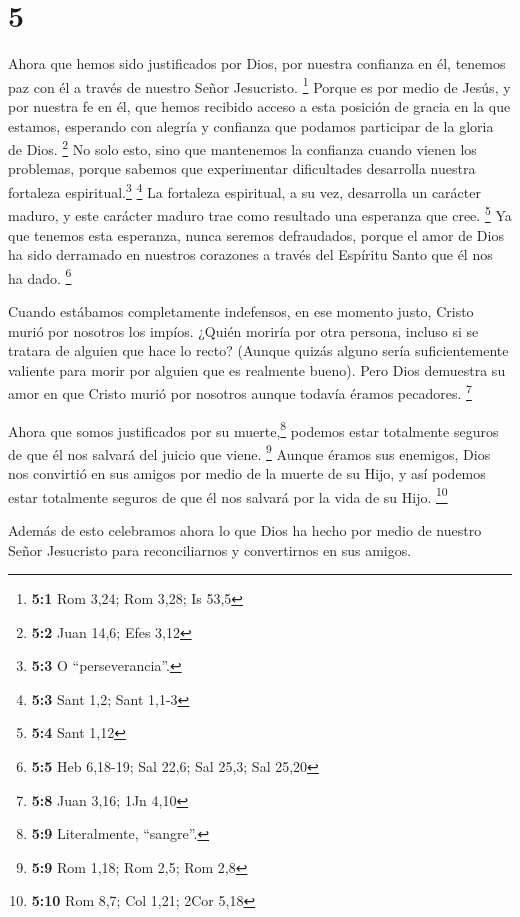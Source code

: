 \hypertarget{section-4}{%
\section{5}\label{section-4}}

 Ahora que hemos sido justificados por Dios, por nuestra
confianza en él, tenemos paz con él a través de nuestro Señor
Jesucristo. \footnote{\textbf{5:1} Rom 3,24; Rom 3,28; Is 53,5}
 Porque es por medio de Jesús, y por nuestra fe en él, que
hemos recibido acceso a esta posición de gracia en la que estamos,
esperando con alegría y confianza que podamos participar de la gloria de
Dios. \footnote{\textbf{5:2} Juan 14,6; Efes 3,12}  No
solo esto, sino que mantenemos la confianza cuando vienen los problemas,
porque sabemos que experimentar dificultades desarrolla nuestra
fortaleza espiritual.\footnote{\textbf{5:3} O ``perseverancia''.}
\footnote{\textbf{5:3} Sant 1,2; Sant 1,1-3}  La fortaleza
espiritual, a su vez, desarrolla un carácter maduro, y este carácter
maduro trae como resultado una esperanza que cree. \footnote{\textbf{5:4}
  Sant 1,12}  Ya que tenemos esta esperanza, nunca seremos
defraudados, porque el amor de Dios ha sido derramado en nuestros
corazones a través del Espíritu Santo que él nos ha dado. \footnote{\textbf{5:5}
  Heb 6,18-19; Sal 22,6; Sal 25,3; Sal 25,20}

 Cuando estábamos completamente indefensos, en ese momento
justo, Cristo murió por nosotros los impíos.  ¿Quién
moriría por otra persona, incluso si se tratara de alguien que hace lo
recto? (Aunque quizás alguno sería suficientemente valiente para morir
por alguien que es realmente bueno).  Pero Dios demuestra
su amor en que Cristo murió por nosotros aunque todavía éramos
pecadores. \footnote{\textbf{5:8} Juan 3,16; 1Jn 4,10}

 Ahora que somos justificados por su muerte,\footnote{\textbf{5:9}
  Literalmente, ``sangre''.} podemos estar totalmente seguros de que él
nos salvará del juicio que viene. \footnote{\textbf{5:9} Rom 1,18; Rom
  2,5; Rom 2,8}  Aunque éramos sus enemigos, Dios nos
convirtió en sus amigos por medio de la muerte de su Hijo, y así podemos
estar totalmente seguros de que él nos salvará por la vida de su Hijo.
\footnote{\textbf{5:10} Rom 8,7; Col 1,21; 2Cor 5,18}

 Además de esto celebramos ahora lo que Dios ha hecho por
medio de nuestro Señor Jesucristo para reconciliarnos y convertirnos en
sus amigos.

